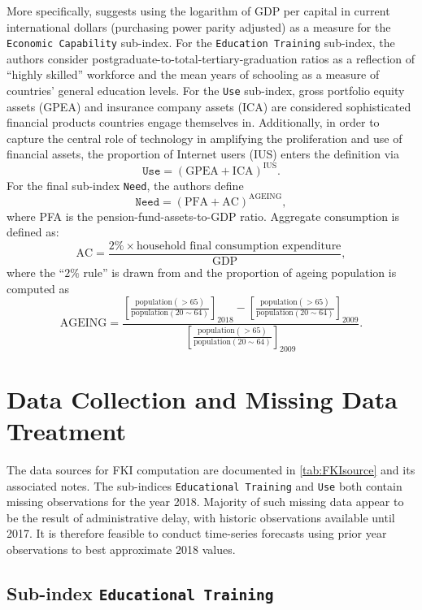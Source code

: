 More specifically, \textcite{olivermarquez:2020} suggests using the logarithm of GDP per capital in current international dollars (purchasing power parity adjusted) as a measure for the \texttt{Economic Capability} sub-index. For the \texttt{Education Training} sub-index, the authors consider postgraduate-to-total-tertiary-graduation ratios as a reflection of ``highly skilled'' workforce and the mean years of schooling as a measure of countries' general education levels. For the \texttt{Use} sub-index, gross portfolio equity assets (GPEA) and insurance company assets (ICA) are considered sophisticated financial products countries engage themselves in. Additionally, in order to capture the central role of technology in amplifying the proliferation and use of financial assets, the proportion of Internet users (\textsc{IUS}) enters the definition via
\[ \texttt{Use} = ( \text{GPEA} + \text{ICA} ) ^ \text{IUS}. \]
For the final sub-index \texttt{Need}, the authors define
\[ \texttt{Need} = ( \text{PFA} + \text{AC} ) ^ \text{AGEING}, \]
where \textsc{PFA} is the pension-fund-assets-to-\textsc{GDP} ratio. Aggregate consumption is defined as:
\[ \text{AC} = \frac{2\% \times \text{household final consumption expenditure}}{\text{GDP}}, \]
where the ``$2\%$ rule'' is drawn from \textcite{caliendo:2013} and the proportion of ageing population is computed as
\[ \text{AGEING} = \frac{ \left[ \frac{\text{population}(>65)}{\text{population}(20 \sim 64)} \right]_{2018} - \left[ \frac{\text{population}(>65)}{\text{population}(20 \sim 64)} \right]_{2009} }{ \left[ \frac{\text{population}(>65)}{\text{population}(20 \sim 64)} \right]_{2009} }. \]

\section{Data Collection and Missing Data Treatment}

The data sources for FKI computation are documented in \cref{tab:FKIsource} and its associated notes. The sub-indices \texttt{Educational Training} and \texttt{Use} both contain missing observations for the year 2018. Majority of such missing data appear to be the result of administrative delay, with historic observations available until 2017. It is therefore feasible to conduct time-series forecasts using prior year observations to best approximate 2018 values.



\subsection{Sub-index \texttt{Educational Training}}

